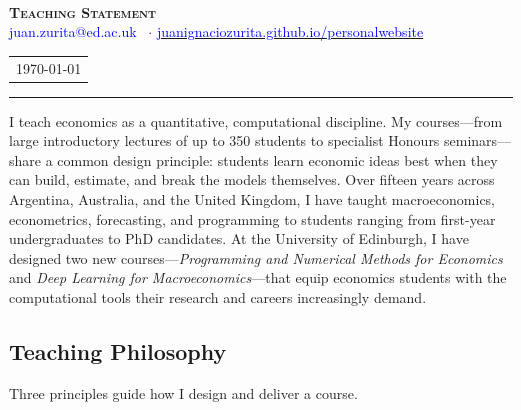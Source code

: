 \documentclass[12pt,a4paper]{article}
\begin{document}
\pagestyle{fancy}
\fancyhf{}
\fancyfoot[C]{\thepage}

\thispagestyle{firstpage}

\vspace{-0.2cm}

\begin{center}
{\LARGE {}} \\
\vspace{0.5em}
\textbf{{\Large \textsc{Teaching Statement}}}
\\
\vspace{0.5cm}
{\small{\textcolor{blue}{juan.zurita@ed.ac.uk} \ $\cdot$ \href{https://juanignaciozurita.github.io/personalwebsite/}{\textcolor{blue}{juanignaciozurita.github.io/personalwebsite}}}}\\
\vspace{-0.0cm}
\begin{tabular}{c @{}}
	\monthyeardate\today
\end{tabular}
\end{center}
\vspace{-1cm}
{\color{BrickRed}\rule{\textwidth}{2pt}}

I teach economics as a quantitative, computational discipline. My courses---from large introductory lectures of up to 350 students to specialist Honours seminars---share a common design principle: students learn economic ideas best when they can build, estimate, and break the models themselves. Over fifteen years across Argentina, Australia, and the United Kingdom, I have taught macroeconomics, econometrics, forecasting, and programming to students ranging from first-year undergraduates to PhD candidates. At the University of Edinburgh, I have designed two new courses---\textit{Programming and Numerical Methods for Economics} and \textit{Deep Learning for Macroeconomics}---that equip economics students with the computational tools their research and careers increasingly demand.

\subsection*{Teaching Philosophy}
\vspace{-0.3cm}

Three principles guide how I design and deliver a course.
\end{document}
